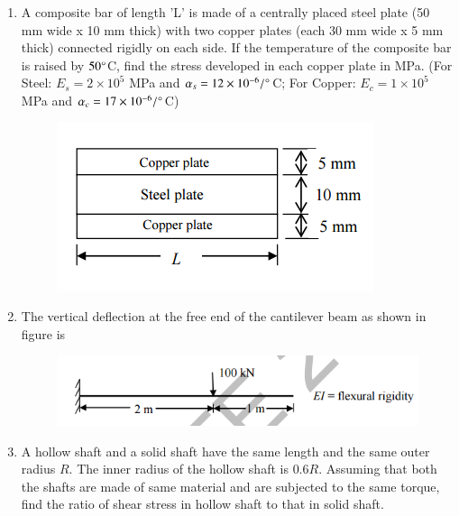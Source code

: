 \documentclass[a4paper,10pt]{article}
\begin{document}
\begin{enumerate}
    \item A composite bar of length 'L' is made of a centrally placed steel plate (50 mm wide x 10 mm thick) with two copper plates (each 30 mm wide x 5 mm thick) connected rigidly on each side. If the temperature of the composite bar is raised by $50 \degree$C, find the stress developed in each copper plate in MPa.
    (For Steel: $E_s = 2 \times 10^5$ MPa and $\alpha_s = 12 \times 10^{-6} / \degree$C; For Copper: $E_c = 1 \times 10^5$ MPa and $\alpha_c = 17 \times 10^{-6} / \degree$C)
    \begin{figure}[H] \centering \includegraphics[width=0.5\columnwidth]{q10_solid.png} \caption*{} \label{fig:q10_solid} \end{figure}
    
    \hfill{}

    \item The vertical deflection at the free end of the cantilever beam as shown in figure is
    \begin{figure}[H] \centering \includegraphics[width=0.5\columnwidth]{q11_solid.png} \caption*{} \label{fig:q11_solid} \end{figure}
    
    \hfill{}
    \begin{enumerate}[label=\Alph*)]
    \end{enumerate}
    
    \item A hollow shaft and a solid shaft have the same length and the same outer radius $R$. The inner radius of the hollow shaft is $0.6 R$. Assuming that both the shafts are made of same material and are subjected to the same torque, find the ratio of shear stress in hollow shaft to that in solid shaft.
    

\end{enumerate}
\end{document}

